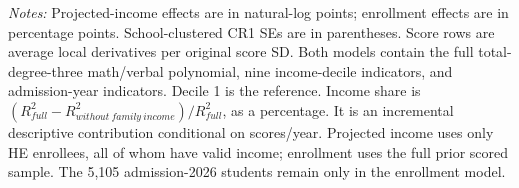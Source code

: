 \begin{table}[!htbp]
\begin{minipage}{0.98\textwidth}\footnotesize
\textit{Notes:} Projected-income effects are in natural-log points; enrollment effects are in percentage points. School-clustered CR1 SEs are in parentheses. Score rows are average local derivatives per original score SD. Both models contain the full total-degree-three math/verbal polynomial, nine income-decile indicators, and admission-year indicators. Decile 1 is the reference. Income share is $(R^2_{full}-R^2_{without\ family\ income})/R^2_{full}$, as a percentage. It is an incremental descriptive contribution conditional on scores/year. Projected income uses only HE enrollees, all of whom have valid income; enrollment uses the full prior scored sample. The 5,105 admission-2026 students remain only in the enrollment model.
\end{minipage}
\end{table}
